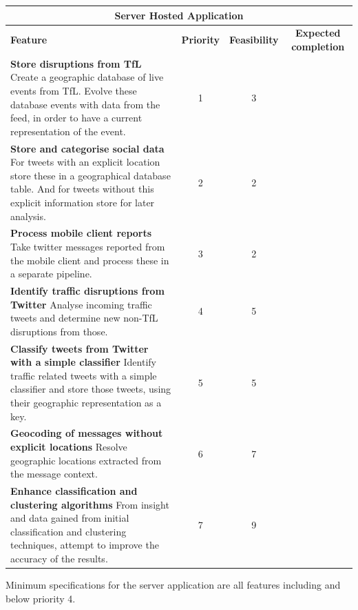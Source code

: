 \begin{center}
\begin{tabular}{ | p{6cm} | c | c | c | }
\hline
\multicolumn{4}{|c|}{\textbf{Server Hosted Application}} \\ \hline
\textbf{Feature} & \textbf{Priority} & \textbf{Feasibility} & \textbf{Expected completion} \\ \hline
\textbf{Store disruptions from TfL} \newline
Create a geographic database of live events from TfL. Evolve these database events with data from the feed, in order to have a current representation of the event. & 1 & 3 & \\ \hline
\textbf{Store and categorise social data} \newline
For tweets with an explicit location store these in a geographical database
table. And for tweets without this explicit information store for later
analysis. & 2 & 2 & \\ \hline
\textbf{Process mobile client reports} \newline
Take twitter messages reported from the mobile client and process these in a
separate pipeline. & 3 & 2 & \\ \hline
\textbf{Identify traffic disruptions from Twitter} \newline
Analyse incoming traffic tweets and determine new non-TfL disruptions from
those. & 4 & 5 & \\ \hline
\textbf{Classify tweets from Twitter with a simple classifier} \newline
Identify traffic related tweets with a simple classifier and store those
tweets, using their geographic representation as a key. & 5 & 5 & \\ \hline
\textbf{Geocoding of messages without explicit locations} \newline
Resolve geographic locations extracted from the message context. & 6 & 7 & \\ \hline
\textbf{Enhance classification and clustering algorithms} \newline
From insight and data gained from initial classification and clustering
techniques, attempt to improve the accuracy of the results. & 7 & 9 & \\ \hline
\end{tabular}
\end{center}
Minimum specifications for the server application are all features including
and below priority 4.
